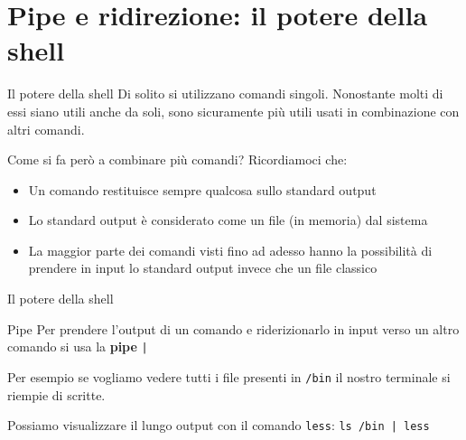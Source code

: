 \documentclass{beamer}
\begin{document}
\section{Pipe e ridirezione: il potere della shell}
\begin{frame}{Il potere della shell}
  Di solito si utilizzano comandi singoli. Nonostante molti di essi siano utili 
  anche da soli, sono sicuramente più utili usati in combinazione con altri 
  comandi.\bigskip

  Come si fa però a combinare più comandi? \pause
  Ricordiamoci che:
  \begin{itemize}
    \item <2-> Un comando restituisce sempre qualcosa sullo standard output
    \item <3-> Lo standard output è considerato come un file (in memoria) dal 
      sistema 
    \item <4-> La maggior parte dei comandi visti fino ad adesso hanno la 
      possibilità di prendere in input lo standard output invece che un file 
      classico
  \end{itemize}
\end{frame}

\begin{frame}{Il potere della shell}
  \begin{figure}
  \end{figure}
\end{frame}

\begin{frame}{Pipe}
  Per prendere l'output di un comando e riderizionarlo in input verso un altro
  comando si usa la \textbf{pipe} \texttt{|}\bigskip

  Per esempio se vogliamo vedere tutti i file presenti in \texttt{/bin} il 
  nostro terminale si riempie di scritte.\bigskip

  Possiamo visualizzare il lungo output con il comando \texttt{less}:\smallskip
  \texttt{ls /bin | less}
\end{frame}
\end{document}
